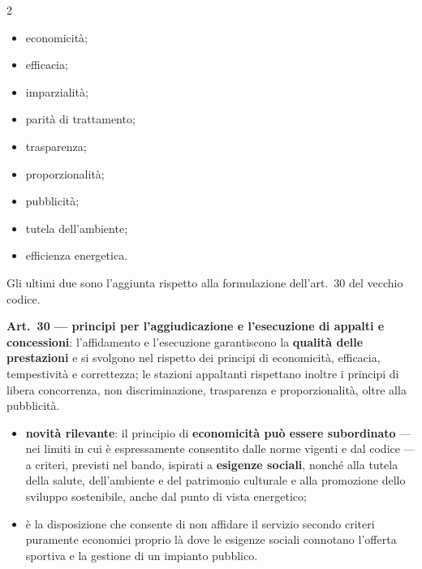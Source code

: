 \begin{multicols}{2}
\begin{itemize}
  \item economicità;
  \item efficacia;
  \item imparzialità;
  \item parità di trattamento;
  \item trasparenza;
  \item proporzionalità;
  \item pubblicità;
  \item tutela dell'ambiente;
  \item efficienza energetica.
\end{itemize}
\end{multicols}

Gli ultimi due sono l'aggiunta rispetto alla formulazione dell'art.\ 30 del vecchio codice.

\textbf{Art.\ 30 --- principi per l'aggiudicazione e l'esecuzione di appalti e concessioni}:
l'affidamento e l'esecuzione garantiscono la \textbf{qualità delle prestazioni} e si svolgono nel
rispetto dei principi di economicità, efficacia, tempestività e correttezza; le stazioni appaltanti
rispettano inoltre i principi di libera concorrenza, non discriminazione, trasparenza e
proporzionalità, oltre alla pubblicità.

\begin{itemize}
  \item \textbf{novità rilevante}: il principio di \textbf{economicità può essere subordinato} ---
    nei limiti in cui è espressamente consentito dalle norme vigenti e dal codice --- a criteri,
    previsti nel bando, ispirati a \textbf{esigenze sociali}, nonché alla tutela della salute,
    dell'ambiente e del patrimonio culturale e alla promozione dello sviluppo sostenibile, anche
    dal punto di vista energetico;
  \item è la disposizione che consente di non affidare il servizio secondo criteri puramente
    economici proprio là dove le esigenze sociali connotano l'offerta sportiva e la gestione di un
    impianto pubblico.
\end{itemize}
